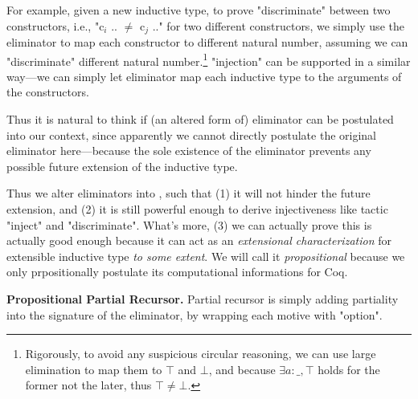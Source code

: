 For example, given a new inductive type, to prove "discriminate" between two constructors, i.e., "c$_i$ .. $\neq$ c$_j$ .." for two different constructors, we simply use the eliminator to map each constructor to different natural number, assuming we can "discriminate" different natural number.\footnote{Rigorously, to avoid any suspicious circular reasoning, we can use large elimination to map them to $\top$ and $\bot$, and because $\exists a : \_, \top$ holds for the former not the later, thus $\top \neq \bot$.} "injection" can be supported in a similar way---we can simply let eliminator map each inductive type to the arguments of the constructors. 

Thus it is natural to think if (an altered form of) eliminator can be postulated into our context, since apparently we cannot directly postulate the original eliminator here---because the sole existence of the eliminator prevents any possible future extension of the inductive type. 

Thus we alter eliminators into , such that (1) it will not hinder the future extension, and (2) it is still powerful enough to derive injectiveness like tactic "inject" and "discriminate". What's more, (3) we can actually prove this  is actually good enough because it can act as an \textit{extensional characterization} for extensible inductive type \textit{to some extent}. We will call it \textit{propositional} because we only prpositionally postulate its computational informations for Coq.

\textbf{Propositional Partial Recursor.} Partial recursor is simply adding partiality into the signature of the eliminator, by wrapping each motive with "option". 

